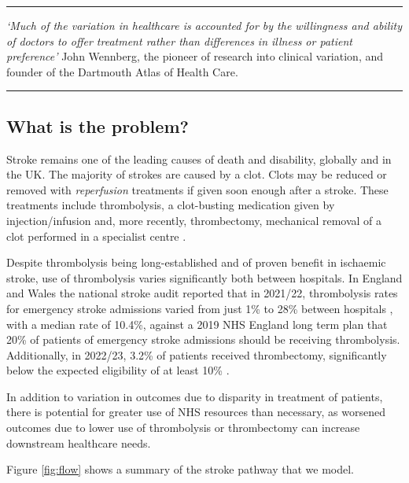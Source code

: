 

\vspace{5mm}
\hrule
\textit{`Much of the variation in healthcare is accounted for by the willingness and ability of doctors to offer treatment rather than differences in illness or patient preference'} John Wennberg, the pioneer of research into clinical variation, and founder of the Dartmouth Atlas of Health Care.
\vspace{2mm}
\hrule

\subsection*{What is the problem?}

Stroke remains one of the leading causes of death and disability, globally and in the UK. The majority of strokes are caused by a clot. Clots may be reduced or removed with \textit{reperfusion} treatments if given soon enough after a stroke. These treatments include thrombolysis, a clot-busting medication given by injection/infusion \cite{emberson_effect_2014} and, more recently, thrombectomy, mechanical removal of a clot performed in a specialist centre \cite{fransen_time_2016}.

Despite thrombolysis being long-established and of proven benefit in ischaemic stroke, use of thrombolysis varies significantly both between hospitals. In England and Wales the national stroke audit reported that in 2021/22, thrombolysis rates for emergency stroke admissions varied from just 1\% to 28\% between hospitals \cite{sentinel_national_stroke_audit_programme_ssnap_2022}, with a median rate of 10.4\%, against a 2019 NHS England long term plan that 20\% of patients of emergency stroke admissions should be receiving thrombolysis. Additionally, in 2022/23, 3.2\% of patients received thrombectomy, significantly below the expected eligibility of at least 10\% \cite{mcmeekin_updating_2021}. 

In addition to variation in outcomes due to disparity in treatment of patients, there is potential for greater use of NHS resources than necessary, as worsened outcomes due to lower use of thrombolysis or thrombectomy can increase downstream healthcare needs.

Figure \ref{fig:flow} shows a summary of the stroke pathway that we model.

